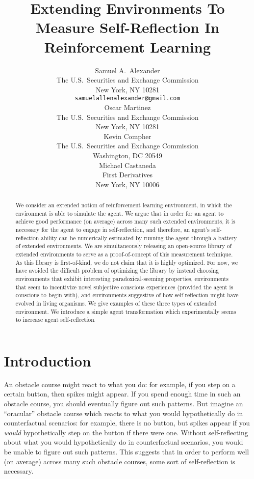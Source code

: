\documentclass{article}
\title{Extending Environments To Measure Self-Reflection In Reinforcement Learning}
\author{
  Samuel A.~Alexander\\
  The U.S.\ Securities and Exchange Commission\\
  New York, NY 10281\\
  \texttt{samuelallenalexander@gmail.com}\\
  \And
  Oscar Martinez\\
  The U.S.\ Securities and Exchange Commission\\
  New York, NY 10281\\
  \And
  Kevin Compher\\
  The U.S.\ Securities and Exchange Commission\\
  Washington, DC 20549\\
  \And
  Michael Castaneda\\
  First Derivatives\\
  New York, NY 10006\\
}
\begin{document}
\maketitle

\begin{abstract}
  We consider an extended notion
  of reinforcement learning environment, in which the environment is able
  to simulate the agent. We argue that in order for an agent to achieve
  good performance (on average) across many such extended environments,
  it is necessary for the agent to engage in self-reflection, and therefore,
  an agent's self-reflection ability can be numerically estimated by running
  the agent through a battery of extended environments.
  We are simultaneously releasing an open-source library of extended
  environments to serve as a proof-of-concept of this measurement technique.
  As this library is first-of-kind, we do not claim that it is highly
  optimized. For now, we have avoided the difficult problem of optimizing
  the library by instead choosing environments that exhibit interesting
  paradoxical-seeming properties, environments that seem to incentivize
  novel subjective conscious experiences (provided the agent is conscious
  to begin with), and environments suggestive of how self-reflection might
  have evolved in living organisms. We give examples of these
  three types of extended environment. We introduce a simple agent
  transformation which experimentally seems to increase agent self-reflection.
\end{abstract}

\section{Introduction}

An obstacle course might react to what you do: for example, if you step on a certain
button, then spikes might appear. If you spend enough time in such an obstacle course,
you should eventually figure out such patterns.
But imagine an ``oracular'' obstacle course which reacts to
what you would hypothetically do in counterfactual scenarios: for example, there is
no button, but spikes appear
if you \emph{would} hypothetically step on the button if there were one. Without
self-reflecting about what you would hypothetically do in counterfactual scenarios, you
would be unable to figure out such patterns. This suggests that in order to perform
well (on average) across many such obstacle courses, some sort of self-reflection is
necessary.
\end{document}
